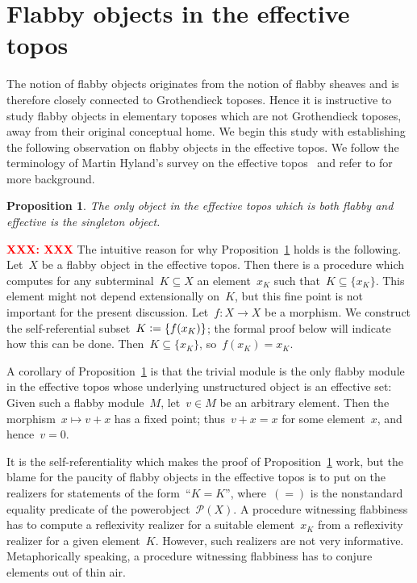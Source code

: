 \documentclass[oneside]{amsart}
\theoremstyle{definition}
\theoremstyle{plain}
\newtheorem{prop}[defn]{Proposition}
\theoremstyle{remark}
\newcommand{\XXX}[1]{\textbf{\textcolor{red}{XXX: #1}}}
\renewcommand{\P}{\mathcal{P}}
\newcommand{\defeq}{\vcentcolon=}
\renewcommand{\_}{\mathpunct{.}\,}
\newcommand{\effective}{ef{}fective\xspace}
\begin{document}
\section{Flabby objects in the \effective topos}
\label{sect:in-eff}

The notion of flabby objects originates from the notion of flabby sheaves and is
therefore closely connected to Grothendieck toposes. Hence it is instructive
to study flabby objects in elementary toposes which are not Grothendieck
toposes, away from their original conceptual home. We begin this study with
establishing the following observation on flabby objects in the \effective
topos. We follow the terminology of Martin Hyland's survey on the \effective
topos~\cite{hyland:effective-topos} and refer to
\cite{oosten:realizability,moerdijk-oosten:topos-theory,phoa:effective,bauer:c2c} for more background.

\begin{prop}\label{prop:flabby-effective-sets}
The only object in the \effective topos which is both flabby and \effective is the
singleton object.
\end{prop}


\XXX{XXX}
The intuitive
reason for why Proposition~\ref{prop:flabby-effective-sets} holds is the
following. Let~$X$ be a flabby object in the \effective topos. Then there is a
procedure which computes for any subterminal~$K \subseteq X$ an element~$x_K$
such that~$K \subseteq \{ x_K \}$. This element might not depend extensionally
on~$K$, but this fine point is not important for the present discussion. Let~$f : X \to X$
be a morphism. We construct the self-referential subset~$K
\defeq \{ f(x_K) \}$; the formal proof below will indicate how this can be
done. Then~$K \subseteq \{ x_K \}$, so~$f(x_K) = x_K$.

A corollary of Proposition~\ref{prop:flabby-effective-sets} is that the trivial
module is the only flabby module in the \effective topos whose underlying
unstructured object is an \effective set: Given such a flabby module~$M$, let~$v
\in M$ be an arbitrary element. Then the morphism~$x \mapsto v + x$ has a fixed
point; thus~$v + x = x$ for some element~$x$, and hence~$v = 0$.

It is the self-referentiality which makes the proof of
Proposition~\ref{prop:flabby-effective-sets} work, but the blame for the paucity
of flabby objects in the \effective topos is to put on the realizers for
statements of the form~``$K = K$'', where~$({=})$ is the nonstandard equality
predicate of the powerobject~$\P(X)$. A procedure witnessing flabbiness has to
compute a reflexivity realizer for a suitable element~$x_K$ from a reflexivity
realizer for a given element~$K$. However, such realizers are not very
informative. Metaphorically speaking, a procedure witnessing flabbiness has to
conjure elements out of thin air.
\end{document}
